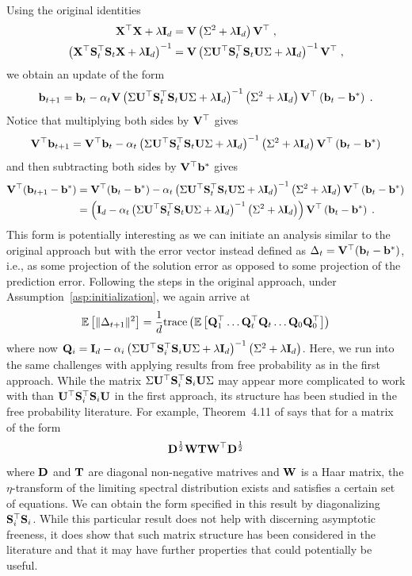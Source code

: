 Using the original identities
\begin{align*}
\mathbf{X}^\top\mathbf{X}+\lambda\mathbf{I}_d &= \mathbf{V}\left(\Sigma^2+ \lambda\mathbf{I}_d\right)\mathbf{V}^\top \;, \\
\left(\mathbf{X}^\top\mathbf{S}_t^\top\mathbf{S}_t\mathbf{X} + \lambda\mathbf{I}_d\right)^{-1} &= \mathbf{V}\left(\Sigma\mathbf{U}^\top\mathbf{S}_t^\top\mathbf{S}_t\mathbf{U}\Sigma + \lambda\mathbf{I}_d\right)^{-1}\mathbf{V}^\top \;,
\end{align*}
we obtain an update of the form
\[
\mathbf{b}_{t+1} = \mathbf{b}_t - \alpha_t\mathbf{V}\left(\Sigma\mathbf{U}^\top\mathbf{S}_t^\top\mathbf{S}_t\mathbf{U}\Sigma + \lambda\mathbf{I}_d\right)^{-1}\left(\Sigma^2 + \lambda\mathbf{I}_d \right)\mathbf{V}^\top\left(\mathbf{b}_t-\mathbf{b}^*\right) \;.
\]
Notice that multiplying both sides by $\mathbf{V}^\top$ gives
\[
\mathbf{V}^\top\mathbf{b}_{t+1} = \mathbf{V}^\top\mathbf{b}_t - \alpha_t\left(\Sigma\mathbf{U}^\top\mathbf{S}_t^\top\mathbf{S}_t\mathbf{U}\Sigma + \lambda\mathbf{I}_d\right)^{-1}\left(\Sigma^2 + \lambda\mathbf{I}_d \right)\mathbf{V}^\top\left(\mathbf{b}_t-\mathbf{b}^*\right)
\]
and then subtracting both sides by $\mathbf{V}^\top\mathbf{b}^*$ gives
\begin{align*}
\mathbf{V}^\top(\mathbf{b}_{t+1}-\mathbf{b}^*) &= \mathbf{V}^\top(\mathbf{b}_t-\mathbf{b}^*) - \alpha_t\left(\Sigma\mathbf{U}^\top\mathbf{S}_t^\top\mathbf{S}_t\mathbf{U}\Sigma + \lambda\mathbf{I}_d\right)^{-1}\left(\Sigma^2 + \lambda\mathbf{I}_d \right)\mathbf{V}^\top\left(\mathbf{b}_t-\mathbf{b}^*\right) \\
&= \left(\mathbf{I}_d - \alpha_t\left(\Sigma\mathbf{U}^\top\mathbf{S}_t^\top\mathbf{S}_t\mathbf{U}\Sigma + \lambda\mathbf{I}_d\right)^{-1}\left(\Sigma^2 + \lambda\mathbf{I}_d \right)\right)\mathbf{V}^\top\left(\mathbf{b}_t-\mathbf{b}^*\right) \;.
\end{align*}
This form is potentially interesting as we can initiate an analysis similar to the original approach but with the error vector instead defined as $\Delta_t=\mathbf{V}^\top(\mathbf{b}_t-\mathbf{b}^*)$, i.e., as some projection of the solution error as opposed to some projection of the prediction error. Following the steps in the original approach, under Assumption~\ref{asp:initialization}, we again arrive at
\[
\mathbb{E}\left[\|\Delta_{t+1}\|^2\right] = \frac{1}{d}\mathrm{trace}\left(\mathbb{E}\left[\mathbf{Q}_1^\top\ldots \mathbf{Q}_t^\top\mathbf{Q}_t\ldots\mathbf{Q}_0\mathbf{Q}_0^\top\right]\right)
\]
where now $\mathbf{Q}_i = \mathbf{I}_d-\alpha_i\left(\Sigma\mathbf{U}^\top\mathbf{S}_i^\top\mathbf{S}_i\mathbf{U}\Sigma + \lambda\mathbf{I}_d\right)^{-1}\left(\Sigma^2 + \lambda\mathbf{I}_d \right)$. Here, we run into the same challenges with applying results from free probability as in the first approach. While the matrix $\Sigma\mathbf{U}^\top\mathbf{S}_i^\top\mathbf{S}_i\mathbf{U}\Sigma$ may appear more complicated to work with than $\mathbf{U}^\top\mathbf{S}_i^\top\mathbf{S}_i\mathbf{U}$ in the first approach, its structure has been studied in the free probability literature. For example, Theorem~4.11 of \citep{Couillet:2011_free} says that for a matrix of the form
\[
\mathbf{D}^\frac{1}{2}\mathbf{W}\mathbf{T}\mathbf{W}^\top\mathbf{D}^\frac{1}{2}
\]
where $\mathbf{D}$ and $\mathbf{T}$ are diagonal non-negative matrives and $\mathbf{W}$ is a Haar matrix, the $\eta$-transform of the limiting spectral distribution exists and satisfies a certain set of equations. We can obtain the form specified in this result by diagonalizing $\mathbf{S}_i^\top\mathbf{S}_i$. While this particular result does not help with discerning asymptotic freeness, it does show that such matrix structure has been considered in the literature and that it may have further properties that could potentially be useful.


